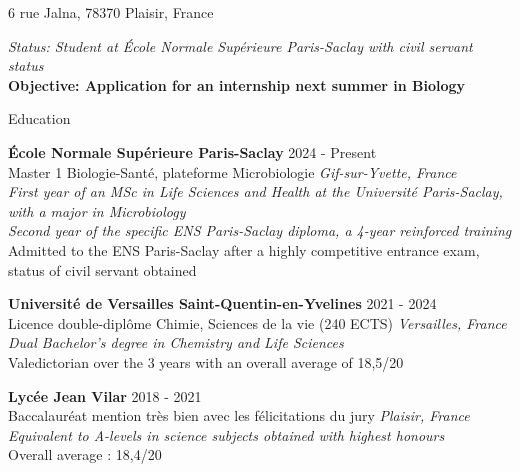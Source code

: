 \documentclass[
	10pt,
]{style} %
\begin{document}
\vspace{-0.25em}

\begin{center}
	6 rue Jalna, 78370 Plaisir, France \\
\end{center}

\begin{center}
	\textit{Status: Student at École Normale Supérieure Paris-Saclay with civil servant status} \\
	\textbf{Objective: Application for an internship next summer in Biology}
\end{center}


\begin{rSection}{Education}

	\textbf{École Normale Supérieure Paris-Saclay} \hfill 2024 - Present \\
	Master 1 Biologie-Santé, plateforme Microbiologie  \hfill \textit{Gif-sur-Yvette, France} \\
	\textit{First year of an MSc in Life Sciences and Health at the Université Paris-Saclay, with a major in Microbiology} \\
	\textit{Second year of the specific ENS Paris-Saclay diploma, a 4-year reinforced training} \\
	Admitted to the ENS Paris-Saclay after a highly competitive entrance exam, status of civil servant obtained

	\vspace{0.5mm}

	\textbf{Université de Versailles Saint-Quentin-en-Yvelines} \hfill 2021 - 2024 \\
	Licence double-diplôme Chimie, Sciences de la vie (240 ECTS) \hfill \textit{Versailles, France} \\
	\textit{Dual Bachelor's degree in Chemistry and Life Sciences} \\
	Valedictorian over the 3 years with an overall average of 18,5/20

	\vspace{0.5mm}

	\textbf{Lycée Jean Vilar} \hfill 2018 - 2021 \\
	Baccalauréat mention très bien avec les félicitations du jury \hfill \textit{Plaisir, France} \\
	\textit{Equivalent to A-levels in science subjects obtained with highest honours} \\
	Overall average : 18,4/20
\end{rSection}
\end{document}
